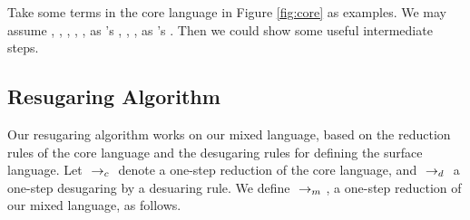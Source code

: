 Take some terms in the core language in Figure \ref{fig:core} as examples.
We may assume , , , , ,  as 's , , \m{$\lambda$},  as 's . Then we could show some useful intermediate steps.


\subsection{Resugaring Algorithm}

Our resugaring algorithm works on our mixed language, based on the reduction rules of the core language and the desugaring rules for defining the surface language. Let $~\rightarrow_c~$ denote a one-step reduction of the core language, and $~\rightarrow_d~$ a one-step desugaring by a desuaring rule. We define $~\rightarrow_m~$, a one-step reduction of our mixed language, as follows.

{}

{}



